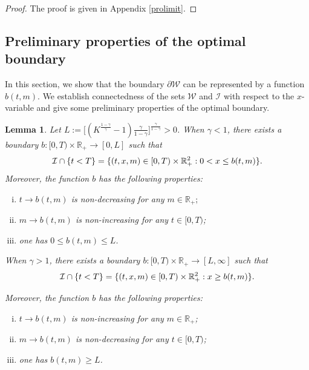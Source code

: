 \documentclass[a4paper,11pt]{amsart}
\numberwithin{equation}{section}
\newtheorem{lemma}{Lemma}[section]
\newcommand{\blue}[1]{{\color{black}#1}}
\begin{document}
{\begin{proof}
The proof is given in Appendix \ref{prolimit}.


\end{proof}



















\subsection{Preliminary properties of the optimal boundary}

In this section, we show that the boundary $\partial \mathcal{W}$ can be represented by a function $b(t,m)$. We establish connectedness of the sets $\mathcal{W}$ and $\mathcal{I}$ with respect to the $x$-variable and give some preliminary properties of the optimal boundary. 

\begin{lemma}\label{b}
 \blue{Let $L:=\big[(K^{\frac{1-\gamma}{\gamma}}-1)\frac{\gamma}{1-\gamma}\big]^{\frac{\gamma}{1-\gamma}}>0$.} \blue{When $\gamma<1$, there exists a boundary $b:[0,T)\times\mathbb R_+\to[0,L]$ such that}
\begin{align}\label{stopping1}
\blue{\mathcal{I} \cap \{t<T\} =\{(t,x,m)\in[0,T)\times\mathbb R_+^2:0<x\leq b(t,m)\}.}
\end{align}
Moreover, the function $b$ has the following properties:
\begin{enumerate}[(i)]
	\item $t \to b(t,m)$ is non-decreasing for any $m \in \mathbb{R}_+;$
\item $m \to b(t,m)$ is non-increasing for any $t \in [0,T)$;
	\item \blue{one has $0\leq b(t,m)\leq L$.}
\end{enumerate}


\blue{When $\gamma>1$, there exists a boundary $b:[0,T)\times\mathbb R_+\to[L,\infty]$ such that}
\begin{align}\label{stopping2}
\blue{\mathcal{I} \cap \{t<T\} =\{(t,x,m)\in[0,T)\times\mathbb R_+^2:x\geq b(t,m)\}.}
\end{align}

Moreover, the function $b$ has the following properties:
\begin{enumerate}[(i)]
	\item $t \to b(t,m)$ is non-increasing for any $m \in \mathbb{R}_+$;
\item $m \to b(t,m)$ is non-decreasing for any $t \in [0,T)$;
	\item  \blue{one has $b(t,m)\geq L$.}
\end{enumerate}
\end{lemma}

}
\end{document}
